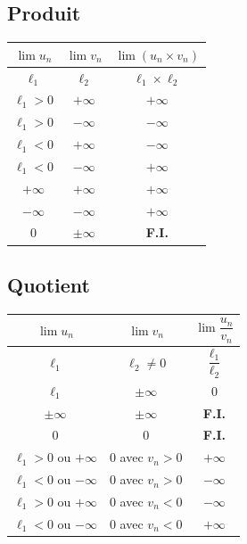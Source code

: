\documentclass[11pt,a4paper,openany]{book}
\theoremstyle{definition}
\begin{document}
    \subsection{Produit}
    \begin{Propriété}
    \begin{center}
    \begin{tabular}{|c|c|c|}
        \hline
        $\lim u_n$ & $\lim v_n$ & $\lim(u_n\times v_n)$ \\
        \hline
        $\ell_1$ & $\ell_2$ & $\ell_1\times\ell_2$ \\
        \hline
        $\ell_1>0$ & $+\infty$ & $+\infty$ \\
        \hline
        $\ell_1>0$ & $-\infty$ & $-\infty$ \\
        \hline
        $\ell_1<0$ & $+\infty$ & $-\infty$ \\
        \hline
        $\ell_1<0$ & $-\infty$ & $+\infty$ \\
        \hline
        $+\infty$ & $+\infty$ & $+\infty$ \\
        \hline
        $-\infty$ & $-\infty$ & $+\infty$ \\
        \hline
        $0$ & $\pm\infty$ & \textbf{F.I.} \\
        \hline
    \end{tabular}
    \end{center}
    \end{Propriété}

    \subsection{Quotient}
    \begin{Propriété}
    \begin{center}
    \begin{tabular}{|c|c|c|}
        \hline
        $\lim u_n$ & $\lim v_n$ & $\lim\dfrac{u_n}{v_n}$ \\
        \hline
        $\ell_1$ & $\ell_2\neq 0$ & $\dfrac{\ell_1}{\ell_2}$ \\
        \hline
        $\ell_1$ & $\pm\infty$ & $0$ \\
        \hline
        $\pm\infty$ & $\pm\infty$ & \textbf{F.I.} \\
        \hline
        $0$ & $0$ & \textbf{F.I.} \\
        \hline
        $\ell_1>0$ ou $+\infty$ & $0$ avec $v_n>0$ & $+\infty$ \\
        \hline
        $\ell_1<0$ ou $-\infty$ & $0$ avec $v_n>0$ & $-\infty$ \\
        \hline
        $\ell_1>0$ ou $+\infty$ & $0$ avec $v_n<0$ & $-\infty$ \\
        \hline
        $\ell_1<0$ ou $-\infty$ & $0$ avec $v_n<0$ & $+\infty$ \\
        \hline
    \end{tabular}
    \end{center}
    \end{Propriété}
\end{document}
